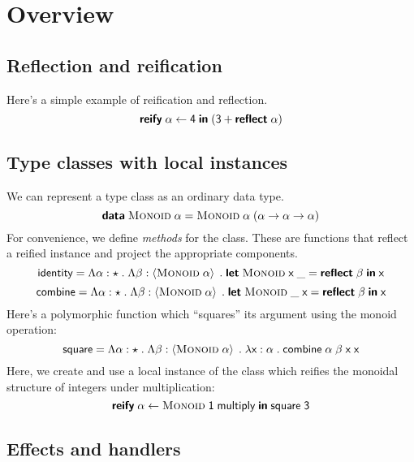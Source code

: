 \section{Overview}

  \subsection{Reflection and reification}

    Here's a simple example of reification and reflection.
    \[ \textsf{\textbf{reify}} \; \alpha \leftarrow \textsf{4} \; \textsf{\textbf{in}} \; \mathopen{}\left( \textsf{3} + \textsf{\textbf{reflect}} \; \alpha \right)\mathclose{} \]

  \subsection{Type classes with local instances}

    We can represent a type class as an ordinary data type.
    \[ \textsf{\textbf{data}} \; \textsf{\textsc{Monoid}} \; \alpha = \textsf{\textsc{Monoid}} \; \alpha \; \mathopen{}\left( \alpha \rightarrow \alpha \rightarrow \alpha \right)\mathclose{} \]
    For convenience, we define \emph{methods} for the class. These are functions that reflect a reified instance and project the appropriate components.
    \[ \textsf{identity} = \Lambda \alpha : \star \; . \; \Lambda \beta : \left\langle \textsf{\textsc{Monoid}} \; \alpha \right\rangle \; . \; \textsf{\textbf{let}} \; \textsf{\textsc{Monoid}} \; \textsf{x} \; \_ = \textsf{\textbf{reflect}} \; \beta \; \textsf{\textbf{in}} \; \textsf{x} \]
    \[ \textsf{combine} = \Lambda \alpha : \star \; . \; \Lambda \beta : \left\langle \textsf{\textsc{Monoid}} \; \alpha \right\rangle \; . \; \textsf{\textbf{let}} \; \textsf{\textsc{Monoid}} \; \_ \; \textsf{x} = \textsf{\textbf{reflect}} \; \beta \; \textsf{\textbf{in}} \; \textsf{x} \]
    Here's a polymorphic function which ``squares'' its argument using the monoid operation:
    \[ \textsf{square} = \Lambda \alpha : \star \; . \; \Lambda \beta : \left\langle \textsf{\textsc{Monoid}} \; \alpha \right\rangle \; . \; \lambda \textsf{x} : \alpha \; . \; \textsf{combine} \; \alpha \; \beta \; \textsf{x} \; \textsf{x} \]
    Here, we create and use a local instance of the class which reifies the monoidal structure of integers under multiplication:
    \[ \textsf{\textbf{reify}} \; \alpha \leftarrow \textsf{\textsc{Monoid}} \; \textsf{1} \; \textsf{multiply} \; \textsf{\textbf{in}} \; \textsf{square} \; \textsf{3} \]

  \subsection{Effects and handlers}
